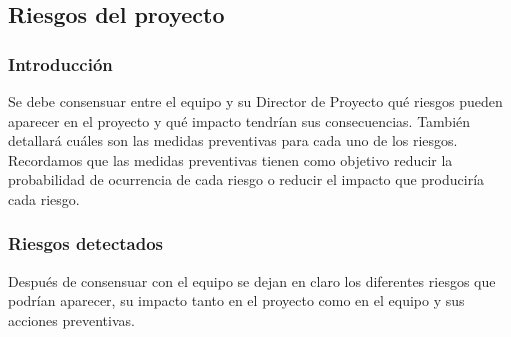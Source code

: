 \newpage

\subsection{Riesgos del proyecto}

\subsubsection{Introducción}
Se debe consensuar entre el equipo y su Director de Proyecto qué riesgos pueden aparecer en el proyecto y qué impacto tendrían sus consecuencias. También detallará cuáles son las medidas preventivas para cada uno de los riesgos. Recordamos que las medidas preventivas tienen como objetivo reducir la probabilidad de ocurrencia de cada riesgo o reducir el impacto que produciría cada riesgo.

\subsubsection{Riesgos detectados}
Después de consensuar con el equipo se dejan en claro los diferentes riesgos que podrían aparecer, su impacto tanto en el proyecto como en el equipo y sus acciones preventivas.

